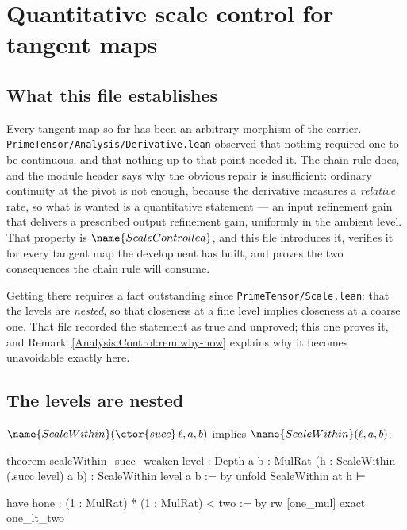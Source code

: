 
\section{Quantitative scale control for tangent maps}
\label{Analysis:Control:sec}


\subsection*{What this file establishes}

Every tangent map so far has been an arbitrary morphism of the carrier.
\texttt{PrimeTensor/Analysis/Derivative.lean} observed that nothing required one
to be continuous, and that nothing up to that point needed it.  The chain rule
does, and the module header says why the obvious repair is insufficient:
ordinary continuity at the pivot is not enough, because the derivative measures
a \emph{relative} rate, so what is wanted is a quantitative statement --- an
input refinement gain that delivers a prescribed output refinement gain,
uniformly in the ambient level.  That property is $\name{ScaleControlled}$, and
this file introduces it, verifies it for every tangent map the development has
built, and proves the two consequences the chain rule will consume.

Getting there requires a fact outstanding since
\texttt{PrimeTensor/Scale.lean}: that the levels are \emph{nested}, so that
closeness at a fine level implies closeness at a coarse one.  That file
recorded the statement as true and unproved; this one proves it, and
Remark~\ref{Analysis:Control:rem:why-now} explains why it becomes unavoidable
exactly here.

\subsection{The levels are nested}

\begin{lemma}
\label{Analysis:Control:lem:weaken-rat}
$\name{ScaleWithin}(\ctor{succ}\,\ell, a, b)$ implies
$\name{ScaleWithin}(\ell, a, b)$.
\end{lemma}

\begin{leancode}
theorem scaleWithin_succ_weaken {level : Depth} {a b : MulRat}
    (h : ScaleWithin (.succ level) a b) :
    ScaleWithin level a b := by
  unfold ScaleWithin at h ⊢

  have hone :
      (1 : MulRat) * (1 : MulRat) < two := by
    rw [one_mul]
    exact one_lt_two
\end{leancode}

